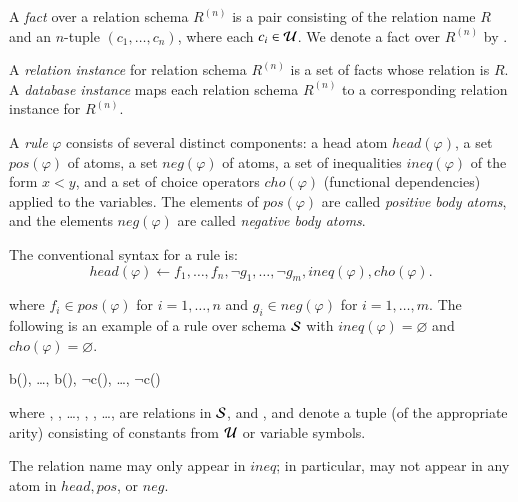 A {\em fact} over a relation schema $R^{(n)}$ is a pair consisting of
the relation name $R$ and an $n$-tuple $(c_1,\ldots,c_n)$, where each
$c_i \in \univ$.  We denote a fact over $R^{(n)}$ by .

A {\em relation instance} for relation schema $R^{(n)}$ is a set of facts whose relation is $R$.
A {\em database instance} maps each relation schema $R^{(n)}$ to a corresponding relation instance for
$R^{(n)}$.

A {\em rule} $\varphi$ consists of several distinct components: a head atom $head(\varphi)$, a set $pos(\varphi)$ of atoms, a set $neg(\varphi)$ of atoms, a set of inequalities $ineq(\varphi)$ of the form $x < y$, and a set of choice operators $cho(\varphi)$ (functional dependencies) applied to the variables.  The elements of $pos(\varphi)$ are called {\em positive body atoms}, and the elements $neg(\varphi)$ are called {\em negative body atoms}.

The conventional syntax for a rule is:
$$head(\varphi) \leftarrow f_1,\ldots,f_n,\lnot g_1,\ldots,\lnot g_m, ineq(\varphi), cho(\varphi).$$

where $f_i \in pos(\varphi)$ for $i = 1,\ldots,n$ and $g_i \in neg(\varphi)$ for $i = 1,\ldots,m$.  The following is an example of a rule over schema $\schema$ with $ineq(\varphi) = \varnothing$ and $cho(\varphi) = \varnothing$.

\begin{Drules}
        {b(), \ldots, b(), $\lnot$c(), \ldots, $\lnot$c()}
\end{Drules}

\noindent where , , \ldots, ,
, \ldots,  are relations in $\schema$, and ,
 and  denote a tuple (of the appropriate arity)
consisting of constants from $\univ$ or variable symbols.

The relation name \dedalus{<} may only appear in $ineq$; in particular, \dedalus{<} may not appear in any atom in $head, pos$, or $neg$.

